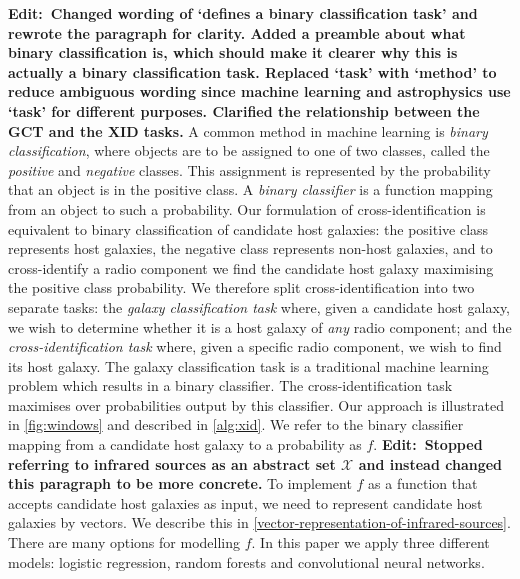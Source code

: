 \documentclass[fleqn,usenatbib,usedcolumn]{mnras}
\newcommand{\edit}[1]{{\bf Edit:~{#1}}}
\begin{document}
    \edit{Changed wording of `defines a binary classification task' and rewrote the paragraph for clarity. Added a preamble about what binary classification is, which should make it clearer why this is actually a binary classification task. Replaced `task' with `method' to reduce ambiguous wording since machine learning and astrophysics use `task' for different purposes. Clarified the relationship between the GCT and the XID tasks.} A common method in machine learning is \emph{binary classification}, where objects are to be assigned to one of two classes, called the \emph{positive} and \emph{negative} classes. This assignment is represented by the probability that an object is in the positive class. A \emph{binary classifier} is a function mapping from an object to such a probability. Our formulation of cross-identification is equivalent to binary classification of candidate host galaxies: the positive class represents host galaxies, the negative class represents non-host galaxies, and to cross-identify a radio component we find the candidate host galaxy maximising the positive class probability. We therefore split cross-identification into two separate tasks: the \emph{galaxy classification task} where, given a candidate host galaxy, we wish to determine whether it is a host galaxy of \emph{any} radio component; and the \emph{cross-identification task} where, given a specific radio component, we wish to find its host galaxy. The galaxy classification task is a traditional machine learning problem which results in a binary classifier. The cross-identification task maximises over probabilities output by this classifier. Our approach is illustrated in \autoref{fig:windows} and described in \autoref{alg:xid}. We refer to the binary classifier mapping from a candidate host galaxy to a probability as $f$. \edit{Stopped referring to infrared sources as an abstract set $\mathcal X$ and instead changed this paragraph to be more concrete.} To implement $f$ as a function that accepts candidate host galaxies as input, we need to represent candidate host galaxies by vectors. We describe this in \autoref{vector-representation-of-infrared-sources}. There are many options for modelling $f$. In this paper we apply three different models: logistic regression, random forests and convolutional neural networks.
\end{document}
